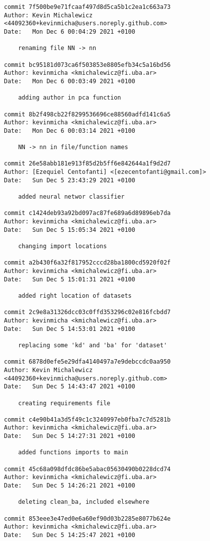 \documentclass[11pt,a4paper]{article}
\begin{document}
\begin{IMTAannexes}
\begin{verbatim}
commit 7f500be9e71fcaaf497d8d5ca5b1c2ea1c663a73
Author: Kevin Michalewicz <44092360+kevinmicha@users.noreply.github.com>
Date:   Mon Dec 6 00:04:29 2021 +0100

    renaming file NN -> nn

commit bc95181d073ca6f503853e8805efb34c5a16bd56
Author: kevinmicha <kmichalewicz@fi.uba.ar>
Date:   Mon Dec 6 00:03:49 2021 +0100

    adding author in pca function

commit 8b2f498cb22f8299536696ce88560adfd141c6a5
Author: kevinmicha <kmichalewicz@fi.uba.ar>
Date:   Mon Dec 6 00:03:14 2021 +0100

    NN -> nn in file/function names

commit 26e58abb181e913f85d2b5ff6e842644a1f9d2d7
Author: [Ezequiel Centofanti] <[ezecentofanti@gmail.com]>
Date:   Sun Dec 5 23:43:29 2021 +0100

    added neural networ classifier

commit c1424deb93a92bd097ac87fe689a6d89896eb7da
Author: kevinmicha <kmichalewicz@fi.uba.ar>
Date:   Sun Dec 5 15:05:34 2021 +0100

    changing import locations

commit a2b430f6a32f817952cccd28ba1800cd5920f02f
Author: kevinmicha <kmichalewicz@fi.uba.ar>
Date:   Sun Dec 5 15:01:31 2021 +0100

    added right location of datasets

commit 2c9e8a31326dcc03c0ffd353296c02e816fcbdd7
Author: kevinmicha <kmichalewicz@fi.uba.ar>
Date:   Sun Dec 5 14:53:01 2021 +0100

    replacing some 'kd' and 'ba' for 'dataset'

commit 6878d0efe5e29dfa4140497a7e9debccdc0aa950
Author: Kevin Michalewicz <44092360+kevinmicha@users.noreply.github.com>
Date:   Sun Dec 5 14:43:47 2021 +0100

    creating requirements file

commit c4e90b41a3d5f49c1c3240997eb0fba7c7d5281b
Author: kevinmicha <kmichalewicz@fi.uba.ar>
Date:   Sun Dec 5 14:27:31 2021 +0100

    added functions imports to main

commit 45c68a098dfdc86be5abac05630490b0228dcd74
Author: kevinmicha <kmichalewicz@fi.uba.ar>
Date:   Sun Dec 5 14:26:21 2021 +0100

    deleting clean_ba, included elsewhere

commit 853eee3e47ed0e6a60ef90d03b2285e8077b624e
Author: kevinmicha <kmichalewicz@fi.uba.ar>
Date:   Sun Dec 5 14:25:47 2021 +0100


\end{verbatim}
\end{IMTAannexes}
\end{document}
